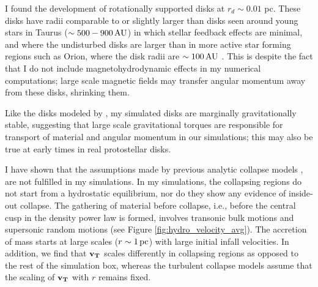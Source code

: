 \documentclass[../dissertation.tex]{subfiles}
\begin{document}
I found the development of rotationally supported disks at $r_d \sim 0.01$ pc.  
These disks have radii comparable to or slightly larger than disks seen around 
young stars in Taurus ($\sim 500 - 900\,\rm AU$) \citep{1999AJ....117.1490P} in which stellar feedback effects are minimal,
and where the undisturbed disks are larger than in more active star forming regions such as Orion, 
where the disk radii are $\sim 100\,\rm AU$ \citep{2011ARA&A..49...67W}.  
This is despite the fact that I do not include magnetohydrodynamic effects 
in my numerical computations; large scale magnetic fields may transfer angular 
momentum away from these disks, shrinking them.  

Like the disks modeled by \citet{2010ApJ...708.1585K},
my simulated disks are marginally gravitationally stable, 
suggesting that large scale gravitational torques are 
responsible for transport of material and angular momentum in our simulations; this may
also be true at early times in real protostellar disks.  

I have shown that the assumptions made by previous analytic collapse models
\citep{1977ApJ...214..488S,1992ApJ...396..631M,1997ApJ...476..750M,2003ApJ...585..850M}, 
are not fulfilled in my simulations. 
In my simulations, the collapsing regions do not start from a hydrostatic equilibrium, nor 
do they show any evidence of inside-out collapse. 
The gathering of material before collapse, i.e.,
before the central cusp in the density power law is formed, involves transonic bulk motions 
and supersonic random motions (see Figure \ref{fig:hydro_velocity_avg}). 
The accretion of mass starts at large scales ($r\sim 1\,\rm pc$) with large initial infall velocities. 
In addition, we find that $\mathbf{v_T}$ 
scales differently in collapsing regions as opposed to the rest of the simulation box, 
whereas the turbulent collapse models \citep{1997ApJ...476..750M,2003ApJ...585..850M} assume 
that the scaling of $\mathbf{v_T}$ with $r$ remains fixed.  

\end{document}

